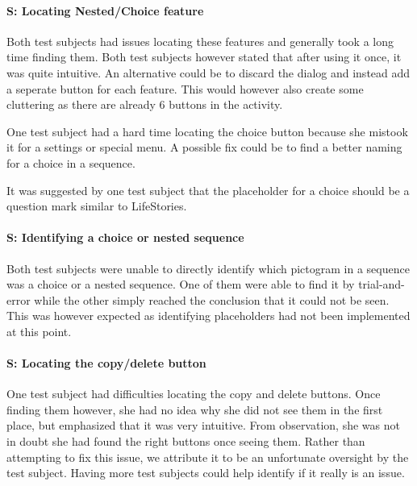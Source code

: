 \paragraph{S: Locating Nested/Choice feature}
Both test subjects had issues locating these features and generally took a long time finding them. Both test subjects however stated that after using it once, it was quite intuitive. An alternative could be to discard the dialog and instead add a seperate button for each feature. This would however also create some cluttering as there are already 6 buttons in the activity.

One test subject had a hard time locating the choice button because she mistook it for a settings or special menu. A possible fix could be to find a better naming for a choice in a sequence.

It was suggested by one test subject that the placeholder for a choice should be a question mark similar to LifeStories.

\paragraph{S: Identifying a choice or nested sequence}
Both test subjects were unable to directly identify which pictogram in a sequence was a choice or a nested sequence. One of them were able to find it by trial-and-error while the other simply reached the conclusion that it could not be seen. This was however expected as identifying placeholders had not been implemented at this point.

\paragraph{S: Locating the copy/delete button}
One test subject had difficulties locating the copy and delete buttons. Once finding them however, she had no idea why she did not see them in the first place, but emphasized that it was very intuitive. From observation, she was not in doubt she had found the right buttons once seeing them. Rather than attempting to fix this issue, we attribute it to be an unfortunate oversight by the test subject. Having more test subjects could help identify if it really is an issue.
